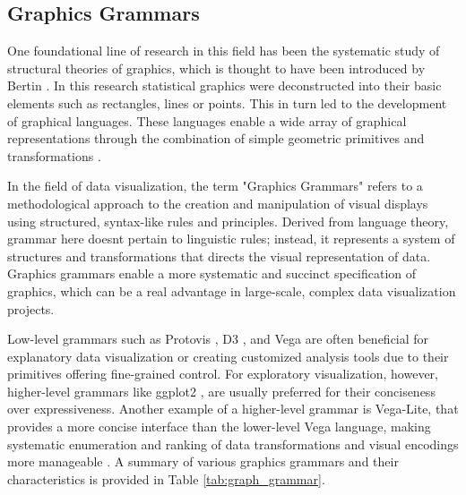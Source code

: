 \subsection{Graphics Grammars}\label{graphics-grammars}

One foundational line of research in this field has been the systematic
study of structural theories of graphics, which is thought to have been
introduced by Bertin \cite{9}. In this research statistical graphics were deconstructed into their basic elements such as rectangles, lines or points. This in turn led to the development of
graphical languages. These languages enable a wide array of graphical
representations through the combination of simple geometric primitives
and transformations \cite{5}.

In the field of data visualization, the term "Graphics Grammars" refers
to a methodological approach to the creation and manipulation of visual
displays using structured, syntax-like rules and principles. Derived
from language theory, grammar here doesn\textquotesingle t pertain to
linguistic rules; instead, it represents a system of structures and
transformations that directs the visual representation of data. Graphics
grammars enable a more systematic and succinct specification of
graphics, which can be a real advantage in large-scale, complex data
visualization projects.

Low-level grammars such as Protovis \cite{10}, D3 \cite{11}, and Vega \cite{12} are often beneficial for explanatory data visualization or creating customized analysis tools due to their primitives offering fine-grained control.
For exploratory visualization, however, higher-level grammars like
ggplot2 \cite{13}, are
usually preferred for their conciseness over expressiveness. Another
example of a higher-level grammar is Vega-Lite, that provides a more
concise interface than the lower-level Vega language, making systematic
enumeration and ranking of data transformations and visual encodings
more manageable \cite{14}. A
summary of various graphics grammars and their characteristics is
provided in Table \ref{tab:graph_grammar}.

